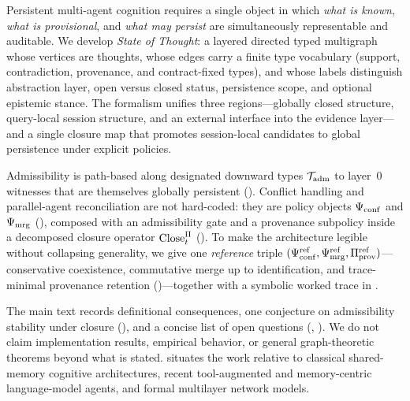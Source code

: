 Persistent multi-agent cognition requires a single object in which \emph{what is known}, \emph{what is provisional}, and \emph{what may persist} are simultaneously representable and auditable.
We develop \emph{State of Thought}: a layered directed typed multigraph whose vertices are thoughts, whose edges carry a finite type vocabulary (support, contradiction, provenance, and contract-fixed types), and whose labels distinguish abstraction layer, open versus closed status, persistence scope, and optional epistemic stance.
The formalism unifies three regions---globally closed structure, query-local session structure, and an external interface into the evidence layer---and a single closure map that promotes session-local candidates to global persistence under explicit policies.

Admissibility is path-based along designated downward types $\mathcal{T}_{\mathrm{adm}}$ to layer~$0$ witnesses that are themselves globally persistent ().
Conflict handling and parallel-agent reconciliation are not hard-coded: they are policy objects $\Psi_{\mathrm{conf}}$ and $\Psi_{\mathrm{mrg}}$ (), composed with an admissibility gate and a provenance subpolicy inside a decomposed closure operator $\mathrm{Close}_t^{\Pi}$ ().
To make the architecture legible without collapsing generality, we give one \emph{reference} triple $(\Psi_{\mathrm{conf}}^{\mathrm{ref}},\Psi_{\mathrm{mrg}}^{\mathrm{ref}},\Pi_{\mathrm{prov}}^{\mathrm{ref}})$---conservative coexistence, commutative merge up to identification, and trace-minimal provenance retention ()---together with a symbolic worked trace in .

The main text records definitional consequences, one conjecture on admissibility stability under closure (), and a concise list of open questions (, ).
We do not claim implementation results, empirical behavior, or general graph-theoretic theorems beyond what is stated.
 situates the work relative to classical shared-memory cognitive architectures, recent tool-augmented and memory-centric language-model agents, and formal multilayer network models.
